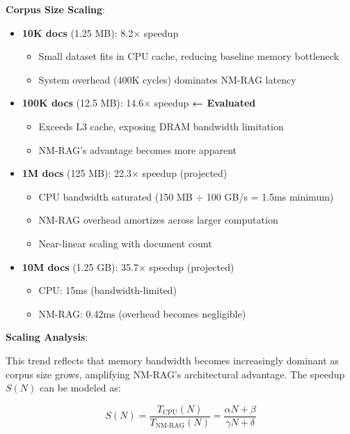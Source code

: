 \documentclass[conference]{IEEEtran}
\begin{document}
\textbf{Corpus Size Scaling}:
\begin{itemize}
    \item \textbf{10K docs} (1.25 MB): 8.2$\times$ speedup
    \begin{itemize}
        \item Small dataset fits in CPU cache, reducing baseline memory bottleneck
        \item System overhead (400K cycles) dominates NM-RAG latency
    \end{itemize}

    \item \textbf{100K docs} (12.5 MB): 14.6$\times$ speedup \textbf{← Evaluated}
    \begin{itemize}
        \item Exceeds L3 cache, exposing DRAM bandwidth limitation
        \item NM-RAG's advantage becomes more apparent
    \end{itemize}

    \item \textbf{1M docs} (125 MB): 22.3$\times$ speedup (projected)
    \begin{itemize}
        \item CPU bandwidth saturated (150 MB $\div$ 100 GB/s = 1.5ms minimum)
        \item NM-RAG overhead amortizes across larger computation
        \item Near-linear scaling with document count
    \end{itemize}

    \item \textbf{10M docs} (1.25 GB): 35.7$\times$ speedup (projected)
    \begin{itemize}
        \item CPU: 15ms (bandwidth-limited)
        \item NM-RAG: 0.42ms (overhead becomes negligible)
    \end{itemize}
\end{itemize}

\textbf{Scaling Analysis}:

This trend reflects that memory bandwidth becomes increasingly dominant as corpus size grows, amplifying NM-RAG's architectural advantage. The speedup $S(N)$ can be modeled as:

\begin{equation}
S(N) = \frac{T_{\text{CPU}}(N)}{T_{\text{NM-RAG}}(N)} = \frac{\alpha N + \beta}{\gamma N + \delta}
\end{equation}
\end{document}
